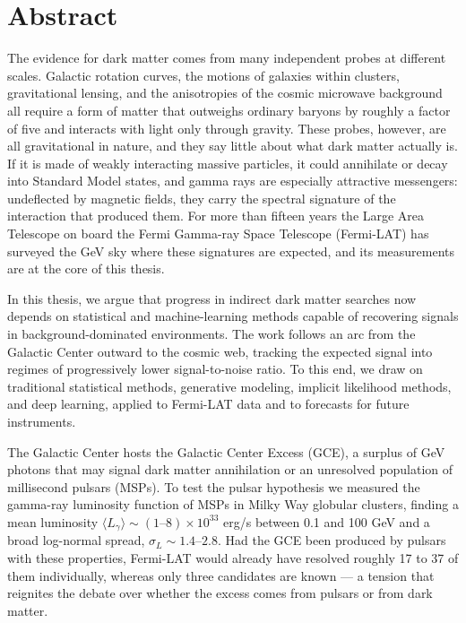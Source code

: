 \chapter*{Abstract}

The evidence for dark matter comes from many independent probes at different scales. Galactic rotation curves, the motions of galaxies within clusters, gravitational lensing, and the anisotropies of the cosmic microwave background all require a form of matter that outweighs ordinary baryons by roughly a factor of five and interacts with light only through gravity. These probes, however, are all gravitational in nature, and they say little about what dark matter actually is. If it is made of weakly interacting massive particles, it could annihilate or decay into Standard Model states, and gamma rays are especially attractive messengers: undeflected by magnetic fields, they carry the spectral signature of the interaction that produced them. For more than fifteen years the Large Area Telescope on board the Fermi Gamma-ray Space Telescope (Fermi-LAT) has surveyed the GeV sky where these signatures are expected, and its measurements are at the core of this thesis.

In this thesis, we argue that progress in indirect dark matter searches now depends on statistical and machine-learning methods capable of recovering signals in background-dominated environments. The work follows an arc from the Galactic Center outward to the cosmic web, tracking the expected signal into regimes of progressively lower signal-to-noise ratio. To this end, we draw on traditional statistical methods, generative modeling, implicit likelihood methods, and deep learning, applied to Fermi-LAT data and to forecasts for future instruments.

The Galactic Center hosts the Galactic Center Excess (GCE), a surplus of GeV photons that may signal dark matter annihilation or an unresolved population of millisecond pulsars (MSPs). To test the pulsar hypothesis we measured the gamma-ray luminosity function of MSPs in Milky Way globular clusters, finding a mean luminosity $\langle L_\gamma\rangle \sim (1\text{--}8)\times10^{33}$ erg/s between 0.1 and 100 GeV and a broad log-normal spread, $\sigma_L \sim 1.4\text{--}2.8$. Had the GCE been produced by pulsars with these properties, Fermi-LAT would already have resolved roughly 17 to 37 of them individually, whereas only three candidates are known --- a tension that reignites the debate over whether the excess comes from pulsars or from dark matter. 

